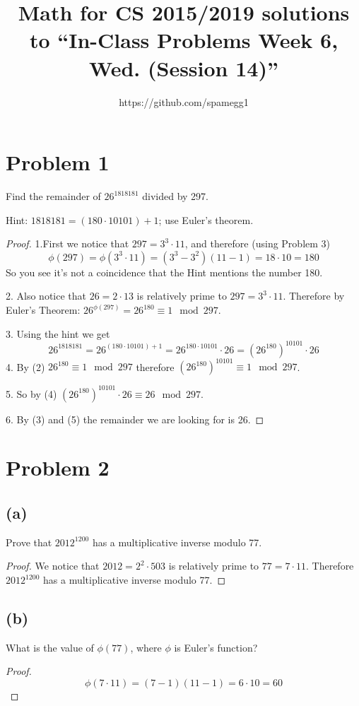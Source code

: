 \documentclass[14pt]{extarticle}
\title{Math for CS 2015/2019 solutions to ``In-Class Problems Week 6, Wed. (Session 14)''}
\author{https://github.com/spamegg1}
\begin{document}
\maketitle
\tableofcontents
\section{Problem 1}
Find the remainder of $26^{1818181}$ divided by 297.

Hint: $1818181 = (180 \cdot 10101) + 1$; use Euler’s theorem.

\begin{proof}
1.First we notice that $297 = 3^3 \cdot 11$, and therefore (using Problem 3)
$$
\phi(297) = \phi(3^3 \cdot 11) = (3^3 - 3^2)(11 - 1) = 18 \cdot 10 = 180
$$
So you see it's not a coincidence that the Hint mentions the number 180.

2. Also notice that $26 = 2 \cdot 13$ is relatively prime to $297 = 3^3 \cdot 11$. Therefore by Euler's Theorem: $26^{\phi(297)} = 26^{180} \equiv 1 \mod 297$.

3. Using the hint we get
$$
26^{1818181} = 26^{(180 \cdot 10101) + 1} = 26^{180 \cdot 10101}\cdot 26 = (26^{180})^{10101}\cdot 26
$$
4. By (2) $26^{180} \equiv 1 \mod 297$ therefore $(26^{180})^{10101} \equiv 1 \mod 297$.

5. So by (4) $(26^{180})^{10101}\cdot 26 \equiv 26 \mod 297$.

6. By (3) and (5) the remainder we are looking for is 26.

\end{proof}

\section{Problem 2}
\subsection{(a)}
Prove that $2012^{1200}$ has a multiplicative inverse modulo 77.
\begin{proof}
We notice that $2012 = 2^2 \cdot 503$ is relatively prime to $77 = 7 \cdot 11$. Therefore $2012^{1200}$ has a multiplicative inverse modulo 77. 
\end{proof}

\subsection{(b)}
What is the value of $\phi(77)$, where $\phi$ is Euler’s function?
\begin{proof}
$$
\phi(7 \cdot 11) = (7 - 1)(11 - 1) = 6 \cdot 10 = 60
$$
\end{proof}
\end{document}
